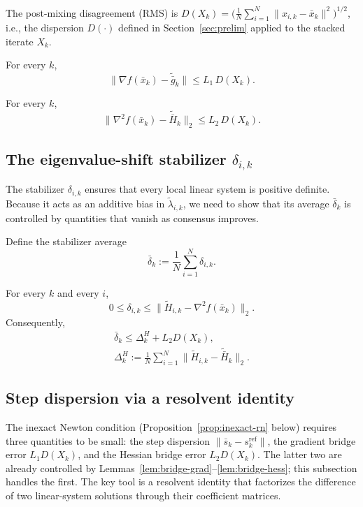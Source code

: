 \documentclass[review,onefignum,onetabnum]{siamart171218}
\begin{document}
The post-mixing disagreement (RMS) is
$D(X_k)=\bigl(\frac1N\sum_{i=1}^N \|x_{i,k}-\bar x_k\|^2\bigr)^{1/2}$,
i.e., the dispersion $D(\cdot)$ defined in Section~\ref{sec:prelim}
applied to the stacked iterate $X_k$.

\begin{lemma}\label{lem:bridge-grad}
For every $k$,
\[
\|\nabla f(\bar x_k)-\tilde{\bar g}_k\|\le L_1\,D(X_k).
\]
\end{lemma}

\begin{lemma}\label{lem:bridge-hess}
For every $k$,
\[
\|\nabla^2 f(\bar x_k)-\tilde{\bar H}_k\|_2\le L_2\,D(X_k).
\]
\end{lemma}

\subsection{The eigenvalue-shift stabilizer \texorpdfstring{$\delta_{i,k}$}{delta\_ik}}\label{ssec:stab}
The stabilizer $\delta_{i,k}$ ensures that every local linear system
is positive definite.
Because it acts as an additive bias in $\tilde\lambda_{i,k}$, we need
to show that its average $\bar\delta_k$ is controlled by quantities
that vanish as consensus improves.

Define the stabilizer average
\[
\bar\delta_k:=\frac1N\sum_{i=1}^N \delta_{i,k}.
\]

\begin{lemma}\label{lem:delta_control}
For every $k$ and every $i$,
\[
0\le \delta_{i,k}\le \big\|\tilde H_{i,k}-\nabla^2 f(\bar x_k)\big\|_2.
\]
Consequently,
\begin{gather*}
\bar\delta_k\le \Delta_k^H + L_2D(X_k),\\
\Delta_k^H:=\tfrac1N\!\sum_{i=1}^N\big\|\tilde H_{i,k}-\tilde{\bar H}_k\big\|_2 .
\end{gather*}
\end{lemma}

\subsection{Step dispersion via a resolvent identity}\label{ssec:stepdisp}
The inexact Newton condition (Proposition~\ref{prop:inexact-rn} below)
requires three quantities to be small: the step dispersion
$\|\bar s_k - s_k^{\mathrm{ref}}\|$, the gradient bridge error
$L_1 D(X_k)$, and the Hessian bridge error $L_2 D(X_k)$.
The latter two are already controlled by
Lemmas~\ref{lem:bridge-grad}--\ref{lem:bridge-hess};
this subsection handles the first.
The key tool is a resolvent identity that factorizes the
difference of two linear-system solutions through their
coefficient matrices.
\end{document}
